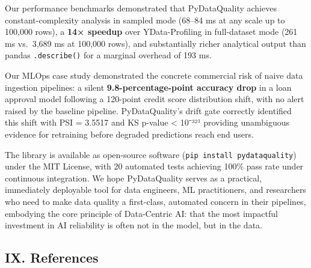 \documentclass{article}
\begin{document}
Our performance benchmarks demonstrated that PyDataQuality achieves
constant-complexity analysis in sampled mode (68--84 ms at any scale up
to 100,000 rows), a \textbf{14× speedup} over YData-Profiling in
full-dataset mode (261 ms vs.~3,689 ms at 100,000 rows), and
substantially richer analytical output than pandas \texttt{.describe()}
for a marginal overhead of 193 ms.

Our MLOps case study demonstrated the concrete commercial risk of naive
data ingestion pipelines: a silent \textbf{9.8-percentage-point accuracy
drop} in a loan approval model following a 120-point credit score
distribution shift, with no alert raised by the baseline pipeline.
PyDataQuality's drift gate correctly identified this shift with PSI =
3.5517 and KS p-value < 10⁻³²¹ providing unambiguous evidence
for retraining before degraded predictions reach end users.

The library is available as open-source software
(\texttt{pip~install~pydataquality}) under the MIT License, with 20
automated tests achieving 100\% pass rate under continuous integration.
We hope PyDataQuality serves as a practical, immediately deployable tool
for data engineers, ML practitioners, and researchers who need to make
data quality a first-class, automated concern in their pipelines,
embodying the core principle of Data-Centric AI: that the most impactful
investment in AI reliability is often not in the model, but in the data.

\subsection{IX. References}\label{ix.-references}
\end{document}
